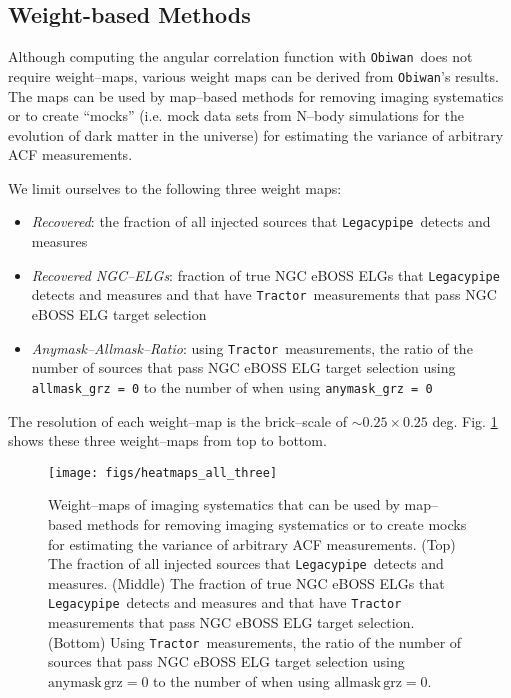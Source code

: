 \documentclass[a4paper,fleqn,usenatbib]{mnras}
\newcommand{\tractor}{{\tt Tractor}}
\newcommand{\legacypipe}{{\tt Legacypipe}}
\newcommand{\obiwan}{{\tt Obiwan}}
\begin{document}
\subsection{Weight-based Methods}

Although computing the angular correlation function with \obiwan\, does not require weight--maps, various weight maps can be derived from \obiwan's results. The maps can be used by map--based methods for removing imaging systematics or to create ``mocks'' (i.e. mock data sets from N--body simulations for the evolution of dark matter in the universe) for estimating the variance of arbitrary ACF measurements. 

We limit ourselves to the following three weight maps: 
\begin{itemize}
\item {\it{Recovered}}: the fraction of all injected sources that \legacypipe\, detects and measures
\item {\it{Recovered NGC--ELGs}}: fraction of true NGC eBOSS ELGs that \legacypipe\, detects and measures and that have \tractor\, measurements that pass NGC eBOSS ELG target selection
\item {\it{Anymask--Allmask--Ratio}}: using \tractor\, measurements, the ratio of the number of sources that pass NGC eBOSS ELG target selection using \verb|allmask_grz = 0| to the number of when using \verb|anymask_grz = 0|
\end{itemize}
The resolution of each weight--map is the brick--scale of $\sim 0.25 \times 0.25$ deg. Fig. \ref{fig:weight-maps} shows these three weight--maps from top to bottom. 

\begin{figure}
\begin{center}
 \texttt{[image: figs/heatmaps\_all\_three]}
\end{center}
 \caption[\obiwan--derived weight--maps for all imaging systematics]{Weight--maps of imaging systematics that can be used by map--based methods for removing imaging systematics or to create mocks for estimating the variance of arbitrary ACF measurements. (Top) The fraction of all injected sources that \legacypipe\, detects and measures. (Middle) The fraction of true NGC eBOSS ELGs that \legacypipe\, detects and measures and that have \tractor\, measurements that pass NGC eBOSS ELG target selection. (Bottom) Using \tractor\, measurements, the ratio of the number of sources that pass NGC eBOSS ELG target selection using $\text{anymask} \, \text{grz} = 0$ to the number of when using $\text{allmask} \, \text{grz} = 0$.}
 \label{fig:weight-maps}
\end{figure}
\end{document}
